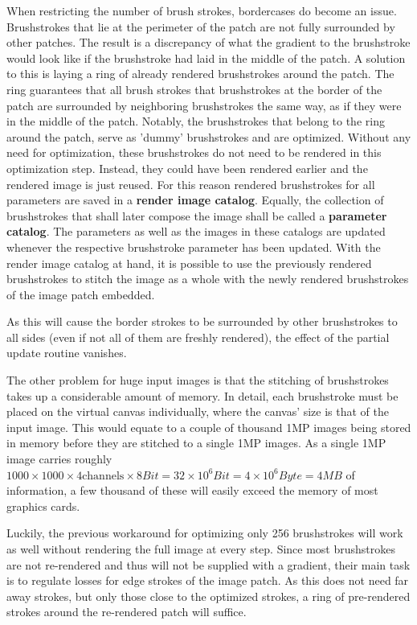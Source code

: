When restricting the number of brush strokes, bordercases do become an issue.
Brushstrokes that lie at the perimeter of the patch are not fully surrounded by other patches.
The result is a discrepancy of what the gradient to the brushstroke would look like if the brushstroke had laid in the middle of the patch.
A solution to this is laying a ring of already rendered brushstrokes around the patch.
The ring guarantees that all brush strokes that brushstrokes at the border of the patch are surrounded by neighboring brushstrokes the same way, as if they were in the middle of the patch.
Notably, the brushstrokes that belong to the ring around the patch, serve as 'dummy' brushstrokes and are optimized.
Without any need for optimization, these brushstrokes do not need to be rendered in this optimization step.
Instead, they could have been rendered earlier and the rendered image is just reused.
For this reason rendered brushstrokes for all parameters are saved in a \textbf{render image catalog}.
Equally, the collection of brushstrokes that shall later compose the image shall be called a \textbf{parameter catalog}.
The parameters as well as the images in these catalogs are updated whenever the respective brushstroke parameter has been updated.
With the render image catalog at hand, it is possible to use the previously rendered brushstrokes to stitch the image as a whole with the newly rendered brushstrokes of the image patch embedded.

As this will cause the border strokes to be surrounded by other brushstrokes to all sides (even if not all of them are freshly rendered), the effect of the partial update routine vanishes.

The other problem for huge input images is that the stitching of brushstrokes takes up a considerable amount of memory.
In detail, each brushstroke must be placed on the virtual canvas individually,  where the canvas' size is that of the input image.
This would equate to a couple of thousand 1MP images being stored in memory before they are stitched to a single 1MP images.
As a single 1MP image carries roughly $1000 \times 1000 \times 4 \text{channels} \times 8 Bit = 32 \times 10^{6} Bit = 4 \times 10^{6} Byte = 4 MB$ of information, a few thousand of these will easily exceed the memory of most graphics cards.

Luckily, the previous workaround for optimizing only 256 brushstrokes will work as well without rendering the full image at every step.
Since most brushstrokes are not re-rendered and thus will not be supplied with a gradient, their main task is to regulate losses for edge strokes of the image patch.
As this does not need far away strokes, but only those close to the optimized strokes, a ring of pre-rendered strokes around the re-rendered patch will suffice.

